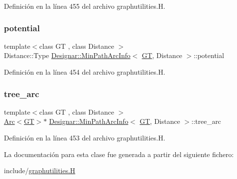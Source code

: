 Definición en la línea 455 del archivo graphutilities.\+H.

\mbox{\label{class_designar_1_1_min_path_arc_info_ae53cddd12f7488ab3daf3711963b533d}} 
\subsubsection{\texorpdfstring{potential}{potential}}
{\footnotesize\ttfamily template$<$class GT , class Distance $>$ \\
Distance\+::\+Type \hyperlink{class_designar_1_1_min_path_arc_info}{Designar\+::\+Min\+Path\+Arc\+Info}$<$ \hyperlink{demo-buildgraph_8_c_a3001c40d2c31ca87ed96cd7d1334a55e}{GT}, Distance $>$\+::potential}



Definición en la línea 454 del archivo graphutilities.\+H.

\mbox{\label{class_designar_1_1_min_path_arc_info_a2f5c165e547c75ec582dd3724a93137c}} 
\subsubsection{\texorpdfstring{tree\+\_\+arc}{tree\_arc}}
{\footnotesize\ttfamily template$<$class GT , class Distance $>$ \\
\hyperlink{namespace_designar_a3f55fb5513d62ff47cbc8f72b8e95d6f}{Arc}$<$\hyperlink{demo-buildgraph_8_c_a3001c40d2c31ca87ed96cd7d1334a55e}{GT}$>$$\ast$ \hyperlink{class_designar_1_1_min_path_arc_info}{Designar\+::\+Min\+Path\+Arc\+Info}$<$ \hyperlink{demo-buildgraph_8_c_a3001c40d2c31ca87ed96cd7d1334a55e}{GT}, Distance $>$\+::tree\+\_\+arc}



Definición en la línea 453 del archivo graphutilities.\+H.



La documentación para esta clase fue generada a partir del siguiente fichero\+:\begin{DoxyCompactItemize}
\item 
include/\hyperlink{graphutilities_8_h}{graphutilities.\+H}\end{DoxyCompactItemize}
